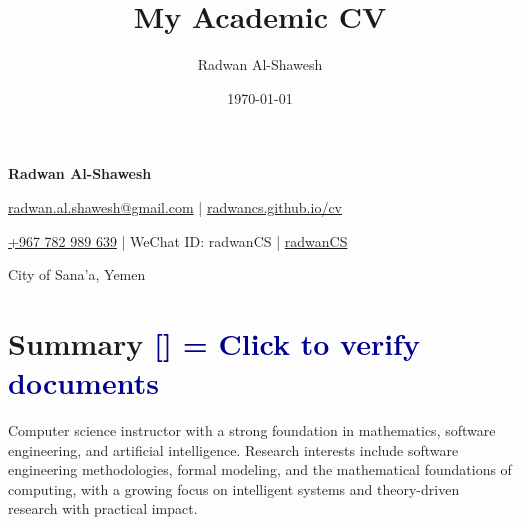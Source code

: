 \documentclass[a4paper,11pt]{article}
\title{My Academic CV}
\author{Radwan Al-Shawesh}
\date{\today}  %
\newcommand{\socialicon}[1]{\raisebox{-0.05em}{\resizebox{!}{1em}{#1}}}
\newcommand{\headerfontiii}{\fontfamily{ppl}\selectfont} %
\begin{document}
	\headerfontiii
	
	\begin{center}
		{\Huge\textbf{Radwan Al-Shawesh}}
	\end{center}
	\vspace{-6mm}
	
	\begin{center}
		\small{
			\href{mailto:radwan.al.shawesh@gmail.com}{radwan.al.shawesh@gmail.com} | 
			\href{https://radwancs.github.io/cv/}{radwancs.github.io/cv}
		}
	\end{center}
	\vspace{-6mm}
	
	\begin{center}
		\small{
			\socialicon{\faWhatsappSquare} \href{https://wa.me/967782989639}{+967 782 989 639} |
			\socialicon{\faWeixin} WeChat ID: radwanCS |
			\socialicon{\faGithub} \href{https://github.com/radwanCS}{radwanCS}
		}
	\end{center}
	\vspace{-6mm}
	
	\begin{center}
		\small{City of Sana'a, Yemen}
	\end{center}
	\vspace{-4mm}

	\section{\texorpdfstring{\textbf{Summary} \hspace*{\fill} 
    \textcolor{darkblue}{\scriptsize [\href{https://1drv.ms/f/c/0b66680558f854cf/EmMcNN-2rp5JkBqREvrLziABZw0qcxK9gYBRxxkRwz2g9A?e=Dd3Xgb}{\faGlobe}] = Click to verify documents}}{Summary}}

	\vspace{1mm}
	\small{
	Computer science instructor with a strong foundation in mathematics, software engineering, and artificial intelligence. Research interests include software engineering methodologies, formal modeling, and the mathematical foundations of computing, with a growing focus on intelligent systems and theory-driven research with practical impact.
	}
	\vspace{-2mm}

\end{document}
